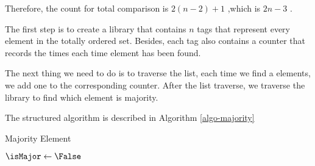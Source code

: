 \begin{questions}
    Therefore, the count for total comparison is \(2(n-2)+1\) ,which is
    \(2n-3\) .


    \question
    The first step is to create a library that contains \(n\) tags that represent every element in the totally ordered set. Besides, each tag also contains a counter that records the times each time element has been found.

    The next thing we need to do is to traverse the list, each time we find a elements, we add one to the corresponding counter. After the list traverse, we traverse the library to find which element is majority.

    The structured algorithm is described in Algorithm \ref{algo-majority}

    \begin{algorithm}
        \caption{Majority Element}
        \label{algo-majority}



        $\isMajor \gets \False$




        \Return{\isMajor}
    \end{algorithm}



\end{questions}


